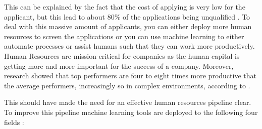 \documentclass[draft,final]{thesisclass} %
\begin{document}
\begin{enumerate}
    This can be explained by the fact that the cost of applying is very low for the applicant, but this lead to about 80\% of the applications being unqualified \cite[4]{ai_recruiting}.
    To deal with this massive amount of applicants, you can either deploy more human resources to screen the applications or you can use machine learning to either automate processes or assist humans such that they can work more productively.
    Human Resources are mission-critical for companies as the human capital is getting more and more important for the success of a company.
    Moreover, research showed that top performers are four to eight times more productive that the average performers, increasingly so in complex environments, according to \cite[4]{ai_recruiting}.
\end{enumerate}
This should have made the need for an effective human resources pipeline clear. To improve this pipeline machine learning tools are deployed to the following four fields \cite[4-8]{ai_recruiting}:
\end{document}
